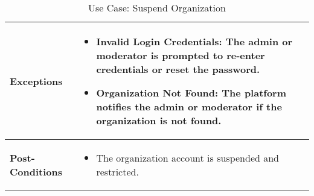 \begin{table}[!ht]
\begin{tabularx}{\textwidth}{|l|X|}
        \hline
        \textbf{Exceptions} & 
        \begin{itemize}[label=--,itemsep=0pt]
            \item Invalid Login Credentials: The admin or moderator is prompted to re-enter credentials or reset the password.
            \item Organization Not Found: The platform notifies the admin or moderator if the organization is not found.
        \end{itemize} \\
        \hline
        \textbf{Post-Conditions} & 
        \begin{itemize}[label=--,itemsep=0pt]
            \item The organization account is suspended and restricted.
        \end{itemize} \\
        \hline
    \end{tabularx}
    \caption{Use Case: Suspend Organization}
    \label{tab:use-case-suspend-organization}
\end{table}

